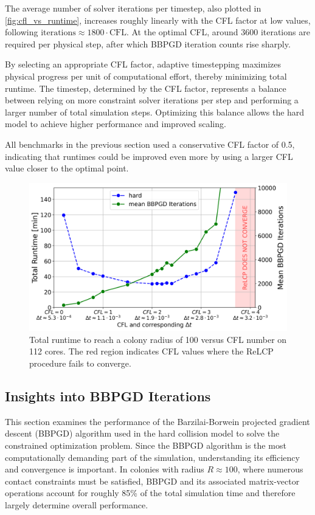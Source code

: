 \documentclass[conference]{IEEEtran}
\begin{document}
The average number of solver iterations per timestep, also plotted in \autoref{fig:cfl_vs_runtime}, increases roughly linearly with the CFL factor at low values, following $\text{iterations} \approx 1800 \cdot \text{CFL}$. At the optimal CFL, around 3600 iterations are required per physical step, after which BBPGD iteration counts rise sharply.

By selecting an appropriate CFL factor, adaptive timestepping maximizes physical progress per unit of computational effort, thereby minimizing total runtime. The timestep, determined by the CFL factor, represents a balance between relying on more constraint solver iterations per step and performing a larger number of total simulation steps. Optimizing this balance allows the hard model to achieve higher performance and improved scaling.

All benchmarks in the previous section used a conservative CFL factor of 0.5, indicating that runtimes could be improved even more by using a larger CFL value closer to the optimal point.

\begin{figure}[h]
    \centering
    \includegraphics[width=\linewidth]{figures/bbpgd/cfl_vs_runtime_and_constraints.png}
    \caption{Total runtime to reach a colony radius of 100 versus CFL number on 112 cores. The red region indicates CFL values where the ReLCP procedure fails to converge.}
    \label{fig:cfl_vs_runtime}
\end{figure}

\newpage

\subsection{Insights into BBPGD Iterations}

This section examines the performance of the Barzilai-Borwein projected gradient descent (BBPGD) algorithm used in the hard collision model to solve the constrained optimization problem. Since the BBPGD algorithm is the most computationally demanding part of the simulation, understanding its efficiency and convergence is important. In colonies with radius $R \approx 100$, where numerous contact constraints must be satisfied, BBPGD and its associated matrix-vector operations account for roughly 85\% of the total simulation time and therefore largely determine overall performance.
\end{document}
